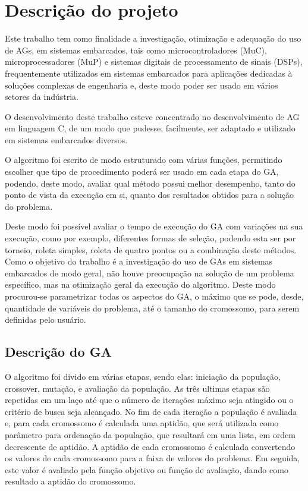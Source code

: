 \documentclass[
    12pt,               %
    oneside,%
    a4paper,            %
    english,            %
    french,             %
    spanish,            %
    brazil,             %
    ]{abntex2}
\begin{document}
\chapter{Descrição do projeto}

 Este trabalho tem como finalidade a investigação, otimização e adequação do uso de AGs, em sistemas embarcados, tais como microcontroladores (MuC), microprocessadores (MuP) e sistemas digitais de processamento de sinais (DSPs), frequentemente utilizados em sistemas embarcados para aplicações dedicadas à soluções complexas de engenharia e, deste modo poder ser usado em vários setores da indústria.

 O desenvolvimento deste trabalho esteve concentrado no desenvolvimento de AG em linguagem C, de um modo que pudesse, facilmente, ser adaptado e utilizado em sistemas embarcados diversos.

 O algoritmo foi escrito de modo estruturado com várias funções, permitindo escolher que tipo de procedimento poderá ser usado em cada etapa do GA, podendo, deste modo, avaliar qual método possui melhor desempenho, tanto do ponto de vista da execução em si, quanto dos resultados obtidos para a solução do problema.

 Deste modo foi possível avaliar o tempo de execução do GA com variações na sua execução, como por exemplo, diferentes formas de seleção, podendo esta ser por torneio, roleta simples, roleta de quatro pontos ou a combinação deste métodos. Como o objetivo do trabalho é a investigação do uso de GAs em sistemas embarcados de modo geral, não houve preocupação na solução de um problema específico, mas na otimização geral da execução do algoritmo. Deste modo procurou-se parametrizar todas os aspectos do GA, o máximo que se pode, desde, quantidade de variáveis do problema, até o tamanho do cromossomo, para serem definidas pelo usuário.

\section{Descrição do GA}

 O algoritmo foi divido em várias etapas, sendo elas: iniciação da população, crossover, mutação, e avaliação da população. As três ultimas etapas são repetidas em um laço até que o número de iterações máximo seja atingido ou o critério de busca seja  alcançado.
 No fim de cada iteração a população é avaliada e, para cada cromossomo é calculada uma aptidão, que será utilizada como parâmetro para ordenação da população, que resultará em uma lista, em ordem decrescente de aptidão. A aptidão de cada cromossomo é calculada convertendo os valores de cada cromossomo para a faixa de valores do problema. Em seguida, este valor é avaliado pela função objetivo ou função de avaliação, dando como resultado a aptidão do cromossomo. 
\end{document}
